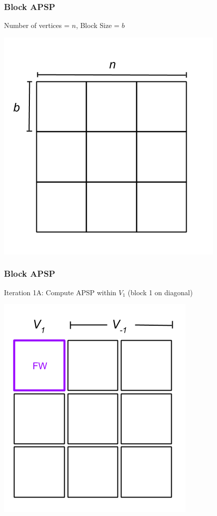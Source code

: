 \documentclass{beamer}
\begin{document}
\begin{frame}
\frametitle{Block APSP}
Number of vertices = $n$, Block Size = $b$
\begin{center}
\includegraphics[scale = 0.4]{blockApsp-1.png}
\end{center}
\end{frame}

\begin{frame}
\frametitle{Block APSP}
Iteration 1A: Compute APSP within $V_1$ (block 1 on diagonal)
\begin{center}
\includegraphics[scale = 0.4]{blockApsp-2.png}
\end{center}
\end{frame}
\end{document}
